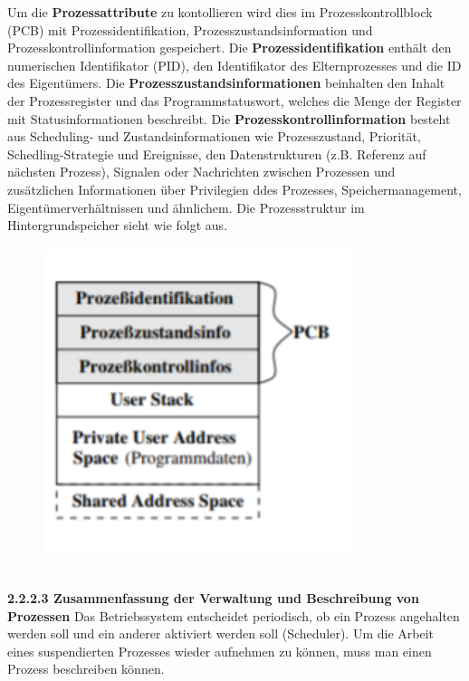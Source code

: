 \documentclass{article}
\begin{document}
    Um die \textbf{Prozessattribute} zu kontollieren wird dies im Prozesskontrollblock (PCB) mit Prozessidentifikation, Prozesszustandsinformation und Prozesskontrollinformation gespeichert. Die \textbf{Prozessidentifikation} enthält den numerischen Identifikator (PID), den Identifikator des Elternprozesses und die ID des Eigentümers. Die \textbf{Prozesszustandsinformationen} beinhalten den Inhalt der Prozessregister und das Programmstatuswort, welches die Menge der Register mit Statusinformationen beschreibt. Die \textbf{Prozesskontrollinformation} besteht aus Scheduling- und Zustandsinformationen wie Prozesszustand, Priorität, Schedling-Strategie und Ereignisse, den Datenstrukturen (z.B. Referenz auf nächsten Prozess), Signalen oder Nachrichten zwischen Prozessen und zusätzlichen Informationen über Privilegien ddes Prozesses, Speichermanagement,  Eigentümerverhältnissen und ähnlichem.\newline
    Die Prozessstruktur im Hintergrundspeicher sieht wie folgt aus.\newline
    \begin{figure}[h]
        \centering
	    \includegraphics[width=90mm]{Skizzen/3_Kapitel/Prozessstruktur_im_Hintergrundspeicher.png}
    \end{figure}
    \\
    \textbf{2.2.2.3 Zusammenfassung der Verwaltung und Beschreibung von Prozessen}\newline
    Das Betriebssystem entscheidet periodisch, ob ein Prozess angehalten werden soll und ein anderer aktiviert werden soll (Scheduler). Um die Arbeit eines suspendierten Prozesses wieder aufnehmen zu können, muss man einen Prozess beschreiben können.
\end{document}
